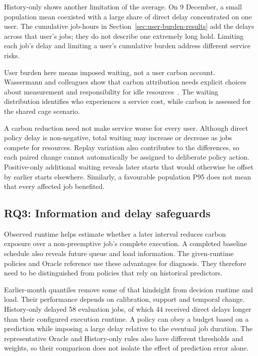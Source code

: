 History-only shows another limitation of the average. On 9 December, a small population mean coexisted with a large share of direct delay concentrated on one user. The cumulative job-hours in Section~\ref{sec:user-burden-results} add the delays across that user's jobs; they do not describe one extremely long hold. Limiting each job's delay and limiting a user's cumulative burden address different service risks.

User burden here means imposed waiting, not a user carbon account. Wassermann and colleagues show that carbon attribution needs explicit choices about measurement and responsibility for idle resources~\cite{wassermann2024usercentric}. The waiting distribution identifies who experiences a service cost, while carbon is assessed for the shared cage scenario.

A carbon reduction need not make service worse for every user. Although direct policy delay is non-negative, total waiting may increase or decrease as jobs compete for resources. Replay variation also contributes to the differences, so each paired change cannot automatically be assigned to deliberate policy action. Positive-only additional waiting reveals later starts that would otherwise be offset by earlier starts elsewhere. Similarly, a favourable population P95 does not mean that every affected job benefited.

\subsection{RQ3: Information and delay safeguards}
Observed runtime helps estimate whether a later interval reduces carbon exposure over a non-preemptive job's complete execution. A completed baseline schedule also reveals future queue and load information. The given-runtime policies and Oracle reference use these advantages for diagnosis. They therefore need to be distinguished from policies that rely on historical predictors.

Earlier-month quantiles remove some of that hindsight from decision runtime and load. Their performance depends on calibration, support and temporal change. History-only delayed 58 evaluation jobs, of which 44 received direct delays longer than their configured execution runtime. A policy can obey a budget based on a prediction while imposing a large delay relative to the eventual job duration. The representative Oracle and History-only rules also have different thresholds and weights, so their comparison does not isolate the effect of prediction error alone.

